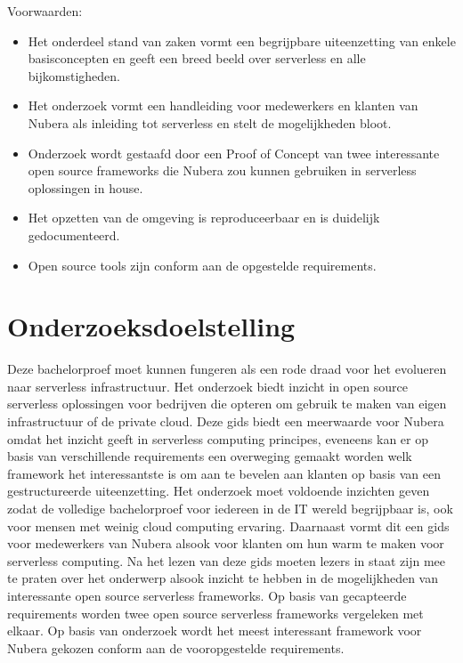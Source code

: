 Voorwaarden: 
\begin{itemize}
    \item Het onderdeel stand van zaken vormt een begrijpbare uiteenzetting van enkele basisconcepten en geeft een breed beeld over serverless en alle bijkomstigheden.
    \item Het onderzoek vormt een handleiding voor medewerkers en klanten van Nubera als inleiding tot serverless en stelt de mogelijkheden bloot.
    \item Onderzoek wordt gestaafd door een Proof of Concept van twee interessante open source frameworks die Nubera zou kunnen gebruiken in serverless oplossingen in house.
    \item Het opzetten van de omgeving is reproduceerbaar en is duidelijk gedocumenteerd.
    \item Open source tools zijn conform aan de opgestelde requirements.
\end{itemize}



\section{Onderzoeksdoelstelling}
\label{sec:onderzoeksdoelstelling}

Deze bachelorproef moet kunnen fungeren als een rode draad voor het evolueren naar serverless infrastructuur. Het onderzoek biedt inzicht in open source serverless oplossingen voor bedrijven die opteren om gebruik te maken van eigen infrastructuur of de private cloud. Deze gids biedt een meerwaarde voor Nubera omdat het inzicht geeft in serverless computing principes, eveneens kan er op basis van verschillende requirements een overweging gemaakt worden welk framework het interessantste is om aan te bevelen aan klanten op basis van een gestructureerde uiteenzetting. Het onderzoek moet voldoende inzichten geven zodat de volledige bachelorproef voor iedereen in de IT wereld begrijpbaar is, ook voor mensen met weinig cloud computing ervaring. Daarnaast vormt dit een gids voor medewerkers van Nubera alsook voor klanten om hun warm te maken voor serverless computing. Na het lezen van deze gids moeten lezers in staat zijn mee te praten over het onderwerp alsook inzicht te hebben in de mogelijkheden van interessante open source serverless frameworks. Op basis van gecapteerde requirements worden twee open source serverless frameworks vergeleken met elkaar. Op basis van onderzoek wordt het meest interessant framework voor Nubera gekozen conform aan de vooropgestelde requirements.



